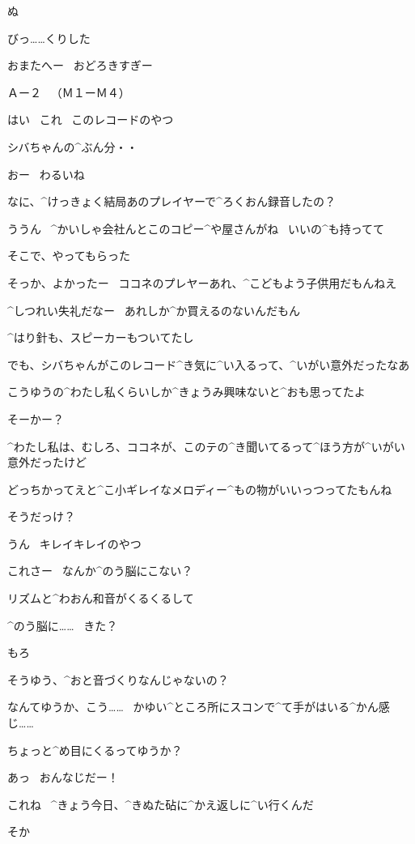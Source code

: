 \SH ぬ

\K びっ……くりした

\SH おまたへー
\ おどろきすぎー

\page
\Sign Ａー２
\ （Ｍ１ーＭ４）

\K はい
\ これ
\ このレコードのやつ

\K シバちゃんの^{ぶん}{分}・・

\SH おー
\ わるいね

\SH なに、^{けっきょく}{結局}あのプレイヤーで^{ろくおん}{録音}したの？

\K ううん
\ ^{かいしゃ}{会社}んとこのコピー^{や}{屋}さんがね
\  いいの^{も}{持}ってて

\K そこで、やってもらった

\SH そっか、よかったー
\ ココネのプレヤーあれ、^{こどもよう}{子供用}だもんねえ

\K ^{しつれい}{失礼}だなー
\ あれしか^{か}{買}えるのないんだもん

\K ^{はり}{針}も、スピーカーもついてたし

\page
\K でも、シバちゃんがこのレコード^{き}{気}に^{い}{入}るって、^{いがい}{意外}だったなあ

\K こうゆうの^{わたし}{私}くらいしか^{きょうみ}{興味}ないと^{おも}{思}ってたよ

\SH そーかー？

\SH ^{わたし}{私}は、むしろ、ココネが、このテの^{き}{聞}いてるって^{ほう}{方}が^{いがい}{意外}だったけど

\SH どっちかってえと^{こ}{小}ギレイなメロディー^{もの}{物}がいいっつってたもんね

\K そうだっけ？

\SH うん
\ キレイキレイのやつ

\page
\SH これさー
\ なんか^{のう}{脳}にこない？

\SH リズムと^{わおん}{和音}がくるくるして

\K ^{のう}{脳}に……
\ きた？

\SH もろ

\SH そうゆう、^{おと}{音}づくりなんじゃないの？

\SH なんてゆうか、こう……
\ かゆい^{ところ}{所}にスコンで^{て}{手}がはいる^{かん}{感}じ……

\SH ちょっと^{め}{目}にくるってゆうか？

\K あっ
\ おんなじだー！

\page
\K これね
\ ^{きょう}{今日}、^{きぬた}{砧}に^{かえ}{返}しに^{い}{行}くんだ

\SH そか

